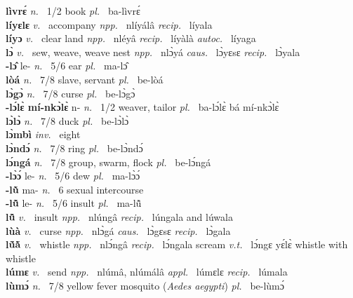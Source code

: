 {\bfseries lìvrɛ́}  {\itshape n.~} 1/2 book {\itshape pl.~} ba-lìvrɛ́    \\ 
{\bfseries líyɛlɛ}  {\itshape v.~} accompany   {\itshape npp.~} nlíyálâ {\itshape recip.~} líyala  \\ 
{\bfseries líyɔ}  {\itshape v.~} clear land   {\itshape npp.~} nléyâ {\itshape recip.~} líyàlà {\itshape autoc.~} líyaga  \\ 
{\bfseries lɔ̀}  {\itshape v.~} sew, weave, weave nest   {\itshape npp.~} nlɔ̀yá {\itshape caus.~} lɔ̀yɛsɛ {\itshape recip.~} lɔ̀yala  \\ 
{\bfseries -lɔ̂} le- {\itshape n.~} 5/6 ear {\itshape pl.~} ma-lɔ̂    \\ 
{\bfseries lòá}  {\itshape n.~} 7/8 slave, servant {\itshape pl.~} be-lòá    \\ 
{\bfseries lɔ̀gɔ̀}  {\itshape n.~} 7/8 curse {\itshape pl.~} be-lɔ̀gɔ̀    \\ 
{\bfseries -lɔ́lɛ̀ mí-nkɔ̀lɛ̀} n- {\itshape n.~} 1/2 weaver, tailor {\itshape pl.~} ba-lɔ́lɛ̀ bá mí-nkɔ̀lɛ̀    \\ 
{\bfseries lɔ̀lɔ̀}  {\itshape n.~} 7/8 duck {\itshape pl.~} be-lɔ̀lɔ̀    \\ 
{\bfseries lɔ̀mbì}  {\itshape inv.~} eight    \\ 
{\bfseries lɔ̀ndɔ́}  {\itshape n.~} 7/8 ring {\itshape pl.~} be-lɔ̀ndɔ́    \\ 
{\bfseries lɔ́ngá}  {\itshape n.~} 7/8 group, swarm, flock {\itshape pl.~} be-lɔ́ngá    \\ 
{\bfseries -lɔ̀ɔ́} le- {\itshape n.~} 5/6 dew {\itshape pl.~} ma-lɔ̀ɔ́    \\ 
{\bfseries -lũ̀} ma- {\itshape n.~} 6 sexual intercourse    \\ 
{\bfseries -lũ̂} le- {\itshape n.~} 5/6 insult {\itshape pl.~} ma-lũ̂    \\ 
{\bfseries lũ̂}  {\itshape v.~} insult   {\itshape npp.~} nlúngâ {\itshape recip.~} lúngala and lúwala\\ 
{\bfseries lùà}  {\itshape v.~} curse   {\itshape npp.~} nlɔ̀gá {\itshape caus.~} lɔ̀gɛsɛ {\itshape recip.~} lɔ̀gala  \\ 
{\bfseries lṹã̀}  {\itshape v.~} whistle   {\itshape npp.~} nlɔ́ngâ {\itshape recip.~} lɔ́ngala scream {\itshape v.t.~} lɔ́ngɛ yɛ́lɛ̀ whistle with whistle  \\ 
{\bfseries lúmɛ}  {\itshape v.~} send   {\itshape npp.~} nlúmâ, nlúmálâ {\itshape appl.~} lúmɛlɛ {\itshape recip.~} lúmala  \\ 
{\bfseries lùmɔ́}  {\itshape n.~} 7/8 yellow fever mosquito ({\itshape Aedes aegypti}) {\itshape pl.~} be-lùmɔ́    \\ 
